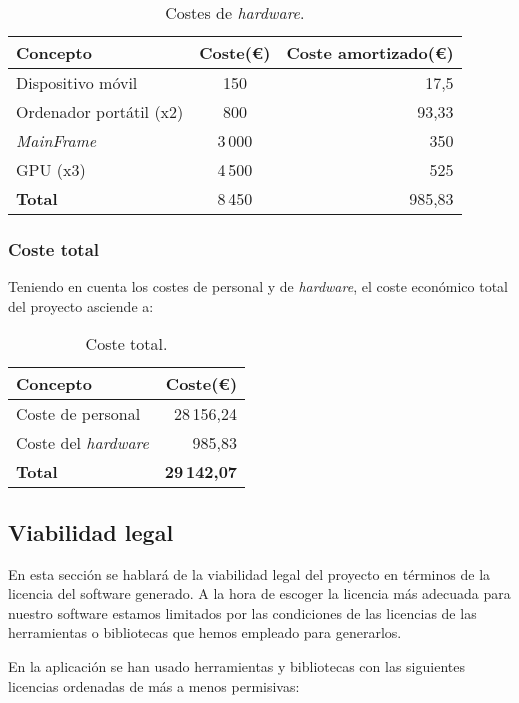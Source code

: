 \begin{table}[H]
	\centering
	\begin{tabular}[]{@{}l c r@{}}
		\toprule
		\textbf{Concepto} & \textbf{Coste(\euro{})} & \textbf{Coste amortizado(\euro{})} \\
		\midrule
		Dispositivo móvil & 150 & 17,5 \\
		Ordenador portátil (x2) & 800 & 93,33 \\
		\textit{MainFrame} & 3\,000 & 350 \\ 
		GPU (x3) & 4\,500 & 525 \\\hubu
		\textbf{Total} & 8\,450 & 985,83 \\
		\bottomrule
	\end{tabular}
	\caption{Costes de \textit{hardware}.}
	\label{tab:costes_hardware}
\end{table}

\subsubsection{Coste total}

Teniendo en cuenta los costes de personal y de \textit{hardware}, el coste económico total del proyecto asciende a:

\begin{table}[H]
	\centering
	\begin{tabular}[]{@{}l r@{}}
		\toprule
		\textbf{Concepto} & \textbf{Coste(\euro{})} \\
		\midrule
		Coste de personal & 28\,156,24 \\ 
		Coste del \textit{hardware} & 985,83 \\\hubu
		\textbf{Total} & \textbf{29\,142,07} \\	
		\bottomrule	
	\end{tabular}
	\caption{Coste total.}
	\label{tab:coste_total}
\end{table}

\subsection{Viabilidad legal}

En esta sección se hablará de la viabilidad legal del proyecto en términos de la licencia del software generado. A la hora de escoger la licencia más adecuada para nuestro software estamos limitados por las condiciones de las licencias de las herramientas o bibliotecas que hemos empleado para generarlos. 

En la aplicación se han usado herramientas y bibliotecas con las siguientes licencias ordenadas de más a menos permisivas: 


